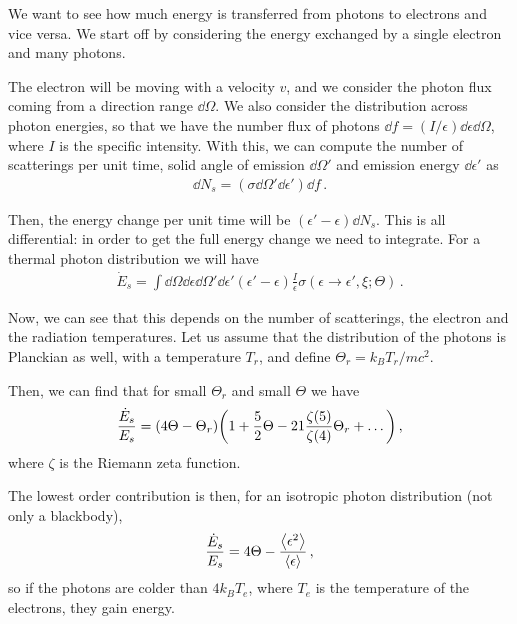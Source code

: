 \documentclass[main.tex]{subfiles}
\begin{document}
We want to see how much energy is transferred from photons to electrons and vice versa. We start off by considering the energy exchanged by a single electron and many photons. 

The electron will be moving with a velocity \(v\), and we consider the photon flux coming from a direction range \(\dd{\Omega }\). We also consider the distribution across photon energies, so that we have the number flux of photons \(\dd{f} = (I/\epsilon ) \dd{\epsilon } \dd{\Omega }\), where \(I\) is the specific intensity.
With this, we can compute the number of scatterings per unit time, solid angle of emission \(\dd{\Omega }' \) and emission energy \(\dd{\epsilon }'\) as 
%
\begin{align}
\dd{N_s} = (\sigma \dd{\Omega }' \dd{\epsilon }') \dd{f}
\,.
\end{align}

Then, the energy change per unit time will be \((\epsilon' - \epsilon ) \dd{N_s}\). 
This is all differential: in order to get the full energy change we need to integrate. For a thermal photon distribution we will have 
%
\begin{align}
\dot{E}_s = \int \dd{\Omega } \dd{\epsilon } \dd{\Omega }' \dd{\epsilon }' 
(\epsilon ' - \epsilon ) \frac{I}{\epsilon } \sigma (\epsilon \to \epsilon ' , \xi ; \Theta )
\,.
\end{align}

Now, we can see that this depends on the number of scatterings, the electron and the radiation temperatures. 
Let us assume that the distribution of the photons is Planckian as well, with a temperature \(T_r\), and define \(\Theta _r = k_B T_r / m c^2\). 

Then, we can find that for small \(\Theta _r\) and small \(\Theta \) we have 
%
\begin{align}
\frac{\dot{E}_s}{E_s} = \qty(4 \Theta - \Theta _r) \qty(1 + \frac{5}{2} \Theta - 21 \frac{\zeta (5)}{\zeta (4)} \Theta _r + \dots)
\,,
\end{align}
%
where \(\zeta \) is  the Riemann zeta function.


The lowest order contribution is then, for an isotropic photon distribution (not only a blackbody),
%
\begin{align}
\frac{\dot{E}_s}{E_s} = 4 \Theta - \frac{\expval{\epsilon^2}}{\expval{\epsilon }}
\,,
\end{align}
%
so if the photons are colder than \(4 k_B T_e\), where \(T_e\) is the temperature of the electrons, they gain energy.
\end{document}
